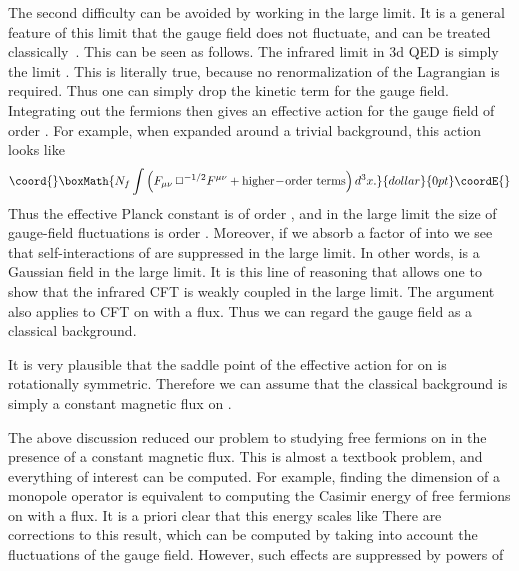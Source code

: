 \documentclass[a4paper,12pt, amsfonts, amssymb]{article}
\providecommand{\RR}{{\mathbb R}}
\providecommand{\ra}{\rightarrow}
\begin{document}
The second difficulty can be avoided by working in the large \coordHE{} limit.
It is a general feature of this limit that the gauge field does not
fluctuate, and can be treated classically~\cite{AP,JT,AH}. 
This can be seen as follows.
The infrared limit in 3d QED is simply the limit \myHighlight{$e\ra\infty$}\coordHE{}. This
is literally true, because no renormalization of the Lagrangian is
required. Thus one can simply drop the kinetic term for the gauge field.
Integrating out the fermions then gives an effective action for the
gauge field of order \coordHE{}. For example, when expanded around a trivial
background, this action looks like
$$\coord{}\boxMath{
N_f \int \left(F_{\mu\nu}\,\Box^{-1/2} F^{\mu\nu} + 
{\rm higher\!-\! order\ terms}\right) d^3 x.
}{dollar}{0pt}\coordE{}$$
Thus the effective Planck constant is of order \coordHE{}, and in the
large \coordHE{} limit the size of gauge-field fluctuations is order \coordHE{}.
Moreover, if we absorb a factor of \coordHE{} into \coordHE{} we see
that self-interactions of \coordHE{} are suppressed in the large \coordHE{} limit. 
In other words, \coordHE{} is a Gaussian field in the large \coordHE{} limit.
It is this
line of reasoning that allows one to show that the infrared CFT is weakly
coupled in the large \coordHE{} limit. The argument also applies
to CFT on \myHighlight{${\bf S}^2\times \RR$}\coordHE{} with a flux. Thus we can regard the
gauge field as a classical background. 

It is very plausible that the
saddle point of the effective action for \coordHE{} on \myHighlight{${\bf S}^2\times \RR$}\coordHE{}
is rotationally symmetric. Therefore we can assume that the classical
background is simply a constant magnetic flux on \coordHE{}.

The above discussion reduced our problem to studying free fermions
on \myHighlight{${\bf S}^2\times \RR$}\coordHE{} in the presence of a constant magnetic flux.
This is almost a textbook problem, and everything of interest can be
computed. For example, finding the dimension of a monopole operator 
is equivalent to computing the Casimir energy of free fermions on \coordHE{}
with a flux. It is a priori clear that this energy scales like \coordHE{}
There are corrections to this result, which can be computed
by taking into account the fluctuations of the gauge field. However, such
effects are suppressed by powers of \coordHE{}
\end{document}
